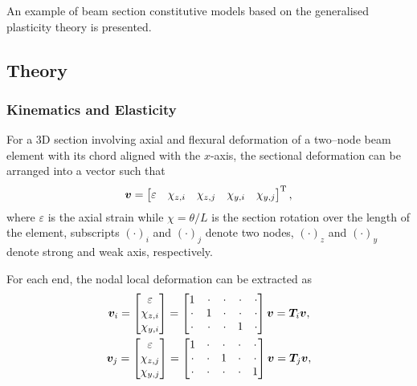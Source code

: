 An example of beam section constitutive models based on the generalised plasticity theory \cite{Auricchio1994} is presented.
\subsection{Theory}
\subsubsection{Kinematics and Elasticity}
For a 3D section involving axial and flexural deformation of a two--node beam element with its chord aligned with the $x$-axis, the sectional deformation can be arranged into a vector such that
\begin{gather}
\bm{v}=\begin{bmatrix}
\varepsilon&\chi_{z,i}&\chi_{z,j}&\chi_{y,i}&\chi_{y,j}
\end{bmatrix}^{\mathrm{T}},
\end{gather}
where $\varepsilon$ is the axial strain while $\chi=\theta/L$ is the section rotation over the length of the element, subscripts $\left(\cdot\right)_i$ and $\left(\cdot\right)_j$ denote two nodes, $\left(\cdot\right)_z$ and $\left(\cdot\right)_y$ denote strong and weak axis, respectively.

For each end, the nodal local deformation can be extracted as
\begin{gather}
\bm{v}_i=\begin{bmatrix}
\varepsilon\\\chi_{z,i}\\\chi_{y,i}
\end{bmatrix}=\begin{bmatrix}
1&\cdot&\cdot&\cdot&\cdot\\
\cdot&1&\cdot&\cdot&\cdot\\
\cdot&\cdot&\cdot&1&\cdot
\end{bmatrix}\bm{v}=\bm{T}_i\bm{v},\\
\bm{v}_j=\begin{bmatrix}
\varepsilon\\\chi_{z,j}\\\chi_{y,j}
\end{bmatrix}=\begin{bmatrix}
1&\cdot&\cdot&\cdot&\cdot\\
\cdot&\cdot&1&\cdot&\cdot\\
\cdot&\cdot&\cdot&\cdot&1
\end{bmatrix}\bm{v}=\bm{T}_j\bm{v},
\end{gather}


